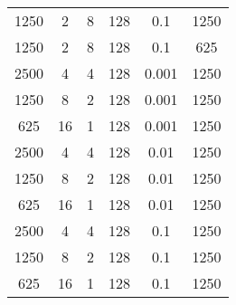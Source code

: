 \begin{tabularx}{\linewidth}{ |c|c|c|c|c|c|  }
    1250 & 2   & 8     & 128 & 0.1   & 1250                                                                                                                               \\
    1250 & 2   & 8     & 128 & 0.1   & 625                                                                                                                                \\
    2500 & 4   & 4     & 128 & 0.001 & 1250                                                                                                                               \\
    1250 & 8   & 2     & 128 & 0.001 & 1250                                                                                                                               \\
    625  & 16  & 1     & 128 & 0.001 & 1250                                                                                                                               \\
    2500 & 4   & 4     & 128 & 0.01  & 1250                                                                                                                               \\
    1250 & 8   & 2     & 128 & 0.01  & 1250                                                                                                                               \\
    625  & 16  & 1     & 128 & 0.01  & 1250                                                                                                                               \\
    2500 & 4   & 4     & 128 & 0.1   & 1250                                                                                                                               \\
    1250 & 8   & 2     & 128 & 0.1   & 1250                                                                                                                               \\
    625  & 16  & 1     & 128 & 0.1   & 1250                                                                                                                               \\
    \hline
\end{tabularx}

